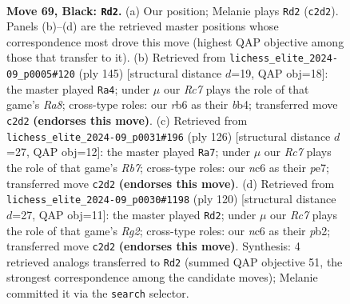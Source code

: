 \documentclass[11pt]{article}
\begin{document}
\clearpage

\begin{figure}[p]\centering
\begin{subfigure}{0.46\textwidth}\centering
\resizebox{\linewidth}{!}{%
\newchessgame
\chessboard[
  setfen={8/6p1/1RN2pk1/7p/3P3P/6PK/2r5/8 b - - 32 69},
  showmover=false,
  pgfstyle=straightmove, color=movearrow, markmove={c2-d2}
]}
\caption{}
\end{subfigure}\hfill
\begin{subfigure}{0.46\textwidth}\centering
\resizebox{\linewidth}{!}{%
\newchessgame
\chessboard[
  setfen={8/8/5pp1/4pk1p/1B5P/6P1/5PK1/r4N2 b - - 31 73},
  showmover=false,
  pgfstyle=straightmove, color=movearrow, markmove={a1-a4}
]}
\caption{}
\end{subfigure}
\\[4pt]
\begin{subfigure}{0.46\textwidth}\centering
\resizebox{\linewidth}{!}{%
\newchessgame
\chessboard[
  setfen={8/1R2p3/3pkp2/8/4P1P1/4PK2/8/3r4 w - - 41 64},
  showmover=false,
  pgfstyle=straightmove, color=movearrow, markmove={b7-a7}
]}
\caption{}
\end{subfigure}\hfill
\begin{subfigure}{0.46\textwidth}\centering
\resizebox{\linewidth}{!}{%
\newchessgame
\chessboard[
  setfen={8/5p2/7k/4PK1p/5P1P/8/1p4R1/1r6 w - - 21 61},
  showmover=false,
  pgfstyle=straightmove, color=movearrow, markmove={g2-d2}
]}
\caption{}
\end{subfigure}
\caption{\textbf{Move 69, Black: \texttt{Rd2}.} (a) Our position; Melanie plays \texttt{Rd2} (\texttt{c2d2}). Panels (b)--(d) are the retrieved master positions whose correspondence most drove this move (highest QAP objective among those that transfer to it). (b) Retrieved from \texttt{lichess\_elite\_2024-09\_p0005\#120} (ply 145) [structural distance $d$=19, QAP obj=18]: the master played \texttt{Ra4}; under $\mu$ our \emph{Rc7} plays the role of that game's \emph{Ra8}; cross-type roles: our \emph{r}b6 as their \emph{b}b4; transferred move \texttt{c2d2} \textbf{(endorses this move)}. (c) Retrieved from \texttt{lichess\_elite\_2024-09\_p0031\#196} (ply 126) [structural distance $d$=27, QAP obj=12]: the master played \texttt{Ra7}; under $\mu$ our \emph{Rc7} plays the role of that game's \emph{Rb7}; cross-type roles: our \emph{n}c6 as their \emph{p}e7; transferred move \texttt{c2d2} \textbf{(endorses this move)}. (d) Retrieved from \texttt{lichess\_elite\_2024-09\_p0030\#1198} (ply 120) [structural distance $d$=27, QAP obj=11]: the master played \texttt{Rd2}; under $\mu$ our \emph{Rc7} plays the role of that game's \emph{Rg2}; cross-type roles: our \emph{n}c6 as their \emph{p}b2; transferred move \texttt{c2d2} \textbf{(endorses this move)}. Synthesis: 4 retrieved analogs transferred to \texttt{Rd2} (summed QAP objective 51, the strongest correspondence among the candidate moves); Melanie committed it via the \texttt{search} selector.}
\label{fig:thought-m137}
\end{figure}
\end{document}
